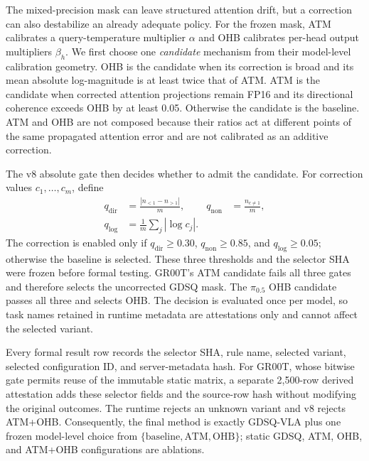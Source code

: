The mixed-precision mask can leave structured attention drift, but a correction can also destabilize an already adequate policy. For the frozen mask, ATM calibrates a query-temperature multiplier $\alpha$ and OHB calibrates per-head output multipliers $\beta_h$. We first choose one \emph{candidate} mechanism from their model-level calibration geometry. OHB is the candidate when its correction is broad and its mean absolute log-magnitude is at least twice that of ATM. ATM is the candidate when corrected attention projections remain FP16 and its directional coherence exceeds OHB by at least 0.05. Otherwise the candidate is the baseline. ATM and OHB are not composed because their ratios act at different points of the same propagated attention error and are not calibrated as an additive correction.

The v8 absolute gate then decides whether to admit the candidate. For correction values $c_1,\ldots,c_m$, define
\begin{align}
q_{\mathrm{dir}}&=\frac{|n_{<1}-n_{>1}|}{m}, &
q_{\mathrm{non}}&=\frac{n_{c\ne1}}{m},\nonumber\\
q_{\log}&=\frac{1}{m}\sum_j|\log c_j|.&&
\label{eq:selector_gate}
\end{align}
The correction is enabled only if $q_{\mathrm{dir}}\ge0.30$, $q_{\mathrm{non}}\ge0.85$, and $q_{\log}\ge0.05$; otherwise the baseline is selected. These three thresholds and the selector SHA were frozen before formal testing. GR00T's ATM candidate fails all three gates and therefore selects the uncorrected GDSQ mask. The $\pi_{0.5}$ OHB candidate passes all three and selects OHB. The decision is evaluated once per model, so task names retained in runtime metadata are attestations only and cannot affect the selected variant.

Every formal result row records the selector SHA, rule name, selected variant, selected configuration ID, and server-metadata hash. For GR00T, whose bitwise gate permits reuse of the immutable static matrix, a separate 2,500-row derived attestation adds these selector fields and the source-row hash without modifying the original outcomes. The runtime rejects an unknown variant and v8 rejects ATM+OHB. Consequently, the final method is exactly GDSQ-VLA plus one frozen model-level choice from $\{\text{baseline},\text{ATM},\text{OHB}\}$; static GDSQ, ATM, OHB, and ATM+OHB configurations are ablations.
